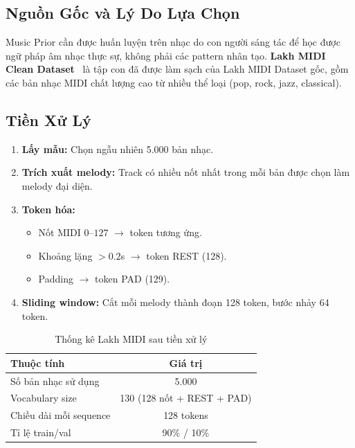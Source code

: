 \subsection{Nguồn Gốc và Lý Do Lựa Chọn}

Music Prior cần được huấn luyện trên nhạc do con người sáng tác
để học được ngữ pháp âm nhạc thực sự, không phải các pattern nhân tạo.
\textbf{Lakh MIDI Clean Dataset}~\cite{raffel2016} là tập con đã được làm sạch
của Lakh MIDI Dataset gốc, gồm các bản nhạc MIDI chất lượng cao
từ nhiều thể loại (pop, rock, jazz, classical).

\subsection{Tiền Xử Lý}

\begin{enumerate}
  \item \textbf{Lấy mẫu:} Chọn ngẫu nhiên 5.000 bản nhạc.
  \item \textbf{Trích xuất melody:} Track có nhiều nốt nhất trong mỗi bản
        được chọn làm melody đại diện.
  \item \textbf{Token hóa:}
        \begin{itemize}
          \item Nốt MIDI $0$--$127$ $\rightarrow$ token tương ứng.
          \item Khoảng lặng $> 0.2$s $\rightarrow$ token REST (128).
          \item Padding $\rightarrow$ token PAD (129).
        \end{itemize}
  \item \textbf{Sliding window:} Cắt mỗi melody thành đoạn 128 token,
        bước nhảy 64 token.
\end{enumerate}

\begin{table}[H]
  \centering
  \caption{Thống kê Lakh MIDI sau tiền xử lý}
  \label{tab:midi_stats}
  \begin{tabular}{lc}
    \toprule
    \textbf{Thuộc tính} & \textbf{Giá trị} \\
    \midrule
    Số bản nhạc sử dụng       & 5.000 \\
    Vocabulary size            & 130 (128 nốt + REST + PAD) \\
    Chiều dài mỗi sequence    & 128 tokens \\
    Tỉ lệ train/val            & 90\% / 10\% \\
    \bottomrule
  \end{tabular}
\end{table}
